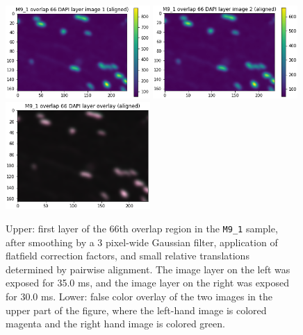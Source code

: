 \documentclass[letterpaper,11pt]{article}
\begin{document}
\begin{figure}[!ht]
\centering
\includegraphics[width=0.49\textwidth]{images/methods/smoothed_flatfielded_aligned_M9_1_overlap_66_dapi_image_1}
\includegraphics[width=0.49\textwidth]{images/methods/smoothed_flatfielded_aligned_M9_1_overlap_66_dapi_image_2}
\includegraphics[width=0.49\textwidth]{images/methods/smoothed_flatfielded_aligned_M9_1_overlap_66_dapi_overlay}
\caption{\footnotesize Upper: first layer of the 66th overlap region in the \texttt{M9\_1} sample, after smoothing by a 3 pixel-wide Gaussian filter, application of flatfield correction factors, and small relative translations determined by pairwise alignment. The image layer on the left was exposed for 35.0 ms, and the image layer on the right was exposed for 30.0 ms. Lower: false color overlay of the two images in the upper part of the figure, where the left-hand image is colored magenta and the right hand image is colored green.}
\label{fig:smoothed_flatfielded_aligned_M9_1_overlap_66}
\end{figure}
\end{document}

